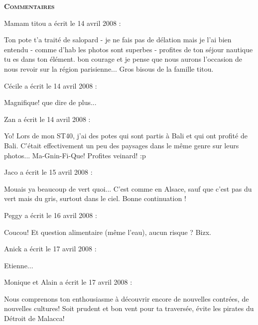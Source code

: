 \bigskip
\textbf{\textsc{Commentaires}}

\medskip
Mamam titou a écrit le 14 avril 2008 :
\begin{displayquote}
Ton pote t'a traité de salopard - je ne fais pas de  délation mais je l'ai bien entendu - comme d'hab les photos sont superbes - profites de ton séjour nautique tu es dans ton élément. bon courage et je pense que nous aurons l'occasion de nous revoir sur la région parisienne... Gros bisous de la famille titou.
\end{displayquote}

\medskip
Cécile a écrit le 14 avril 2008 :
\begin{displayquote}
Magnifique! que dire de plus...
\end{displayquote}

\medskip
Zan a écrit le 14 avril 2008 :
\begin{displayquote}
Yo!
Lors de mon ST40, j'ai des potes qui sont partis à Bali et qui ont profité de Bali. C'était effectivement un peu des paysages dans le même genre sur leurs photos... Ma-Gnin-Fi-Que!
Profites veinard! :p
\end{displayquote}

\medskip
Jaco a écrit le 15 avril 2008 :
\begin{displayquote}
Mouais ya beaucoup de vert quoi... C'est comme en Alsace, sauf que c'est pas du vert mais du gris, surtout dans le ciel.
Bonne continuation !
\end{displayquote}

\medskip
Peggy a écrit le 16 avril 2008 :
\begin{displayquote}
Coucou!
Et question alimentaire (même l'eau), aucun risque ?
Bizx.
\end{displayquote}

\medskip
Anick a écrit le 17 avril 2008 :
\begin{displayquote}
Etienne...
\end{displayquote}

\medskip
Monique et Alain a écrit le 17 avril 2008 :
\begin{displayquote}
Nous comprenons ton enthousiasme à découvrir encore de nouvelles contrées, de nouvelles cultures! Soit prudent et bon vent pour ta traversée, évite les pirates du Détroit de Malacca!
\end{displayquote}

